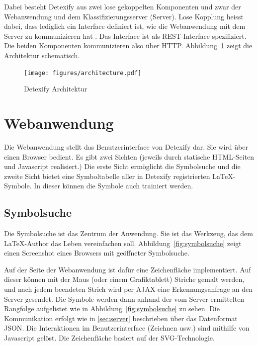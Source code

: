 Dabei besteht Detexify aus zwei lose gekoppelten Komponenten und zwar der Webanwendung und dem Klassifizierungsserver (Server). Lose Kopplung heisst dabei, dass lediglich ein Interface definiert ist, wie die Webanwendung mit dem Server zu kommunizieren hat \cite{Tilkov:2005p11813}. Das Interface ist als \ac{REST}-Interface spezifiziert. Die beiden Komponenten kommunizieren also über \ac{HTTP}. Abbildung~\ref{fig:architecture} zeigt die Architektur schematisch.

\begin{figure}[htbp]
  \centering \texttt{[image: figures/architecture.pdf]}
  \caption{Detexify Architektur}
  \label{fig:architecture}
\end{figure}

\section{Webanwendung} %
\label{sec:webanwendung}


Die Webanwendung stellt das Benutzerinterface von Detexify dar. Sie wird über einen Browser bedient. Es gibt zwei Sichten (jeweils durch statische \ac{HTML}-Seiten und Javascript realisiert.) Die erste Sicht ermöglicht die Symbolsuche und die zweite Sicht bietet eine Symboltabelle aller in Detexify registrierten \LaTeX-Symbole. In dieser können die Symbole auch trainiert werden.

\subsection{Symbolsuche} %
\label{sub:symbolsuche}

Die Symbolsuche ist das Zentrum der Anwendung. Sie ist das Werkzeug, das dem \LaTeX-Author das Leben vereinfachen soll. Abbildung~\ref{fig:symbolsuche} zeigt einen Screenshot eines Browsers mit geöffneter Symbolsuche.

Auf der Seite der Webanwendung ist dafür eine Zeichenfläche implementiert. Auf dieser können mit der Maus (oder einem Grafiktablett) Striche gemalt werden, und nach jedem beendeten Strich wird per AJAX \cite{AJAX} eine Erkennungsanfrage an den Server gesendet. Die Symbole werden dann anhand der vom Server ermittelten Rangfolge aufgelistet wie in Abbildung~\ref{fig:symbolsuche} zu sehen. Die Kommunikation erfolgt wie in \ref{sec:server} beschrieben über das Datenformat \ac{JSON}. Die Interaktionen im Benutzerinterface (Zeichnen usw.) sind mithilfe von Javascript gelöst. Die Zeichenfläche basiert auf der \ac{SVG}-Technologie.

